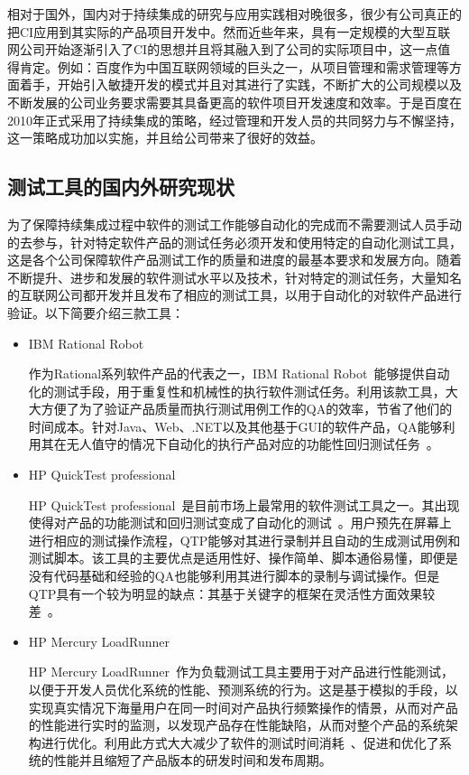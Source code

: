   相对于国外，国内对于持续集成的研究与应用实践相对晚很多，很少有公司真正的把CI应用到其实际的产品项目开发中。然而近些年来，具有一定规模的大型互联网公司开始逐渐引入了CI的思想并且将其融入到了公司的实际项目中，这一点值得肯定。例如：百度作为中国互联网领域的巨头之一，从项目管理和需求管理等方面着手，开始引入敏捷开发的模式并且对其进行了实践，不断扩大的公司规模以及不断发展的公司业务要求需要其具备更高的软件项目开发速度和效率。于是百度在2010年正式采用了持续集成的策略，经过管理和开发人员的共同努力与不懈坚持，这一策略成功加以实施，并且给公司带来了很好的效益。

\subsection{测试工具的国内外研究现状}

  为了保障持续集成过程中软件的测试工作能够自动化的完成而不需要测试人员手动的去参与，针对特定软件产品的测试任务必须开发和使用特定的自动化测试工具，这是各个公司保障软件产品测试工作的质量和进度的最基本要求和发展方向。随着不断提升、进步和发展的软件测试水平以及技术，针对特定的测试任务，大量知名的互联网公司都开发并且发布了相应的测试工具，以用于自动化的对软件产品进行验证。以下简要介绍三款工具：
  
  \begin{itemize}
	\item IBM Rational Robot
	
	  作为Rational系列软件产品的代表之一，IBM Rational Robot~\cite{17}能够提供自动化的测试手段，用于重复性和机械性的执行软件测试任务。利用该款工具，大大方便了为了验证产品质量而执行测试用例工作的QA的效率，节省了他们的时间成本。针对Java、Web、.NET以及其他基于GUI的软件产品，QA能够利用其在无人值守的情况下自动化的执行产品对应的功能性回归测试任务~\cite{18}。
	
	\item HP QuickTest professional
	
	  HP QuickTest professional~\cite{19}是目前市场上最常用的软件测试工具之一。其出现使得对产品的功能测试和回归测试变成了自动化的测试~\cite{20, 21}。用户预先在屏幕上进行相应的测试操作流程，QTP能够对其进行录制并且自动的生成测试用例和测试脚本。该工具的主要优点是适用性好、操作简单、脚本通俗易懂，即便是没有代码基础和经验的QA也能够利用其进行脚本的录制与调试操作。但是QTP具有一个较为明显的缺点：其基于关键字的框架在灵活性方面效果较差~\cite{22, 23}。
	  
	\item HP Mercury LoadRunner

	  HP Mercury LoadRunner~\cite{24}作为负载测试工具主要用于对产品进行性能测试，以便于开发人员优化系统的性能、预测系统的行为。这是基于模拟的手段，以实现真实情况下海量用户在同一时间对产品执行频繁操作的情景，从而对产品的性能进行实时的监测，以发现产品存在性能缺陷，从而对整个产品的系统架构进行优化。利用此方式大大减少了软件的测试时间消耗~\cite{25, 26}、促进和优化了系统的性能并且缩短了产品版本的研发时间和发布周期。
  \end{itemize}
  
